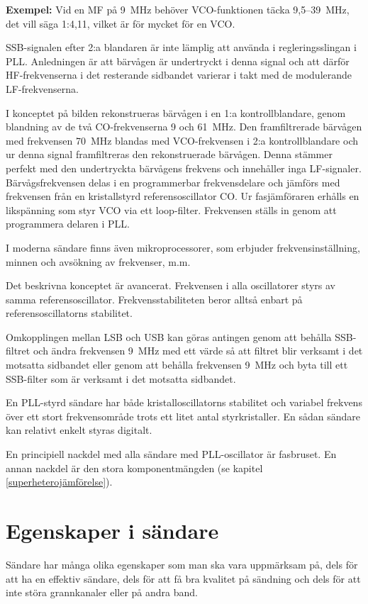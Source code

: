 \textbf{Exempel:} Vid en MF på 9~MHz behöver VCO-funktionen täcka 9,5--39~MHz,
det vill säga 1:4,11, vilket är för mycket för en VCO.

SSB-signalen efter 2:a blandaren är inte lämplig att använda i
regleringsslingan i PLL.
Anledningen är att bärvågen är undertryckt i denna signal och att därför
HF-frekvenserna i det resterande sidbandet varierar i takt med de
modulerande LF-frekvenserna.

I konceptet på bilden rekonstrueras bärvågen i en 1:a kontrollblandare,
genom blandning av de två CO-frekvenserna 9 och 61~MHz.
Den framfiltrerade bärvågen med frekvensen 70~MHz blandas med
VCO-frekvensen i 2:a kontrollblandare och ur denna signal
framfiltreras den rekonstruerade bärvågen.
Denna stämmer perfekt med den undertryckta bärvågens frekvens och
innehåller inga LF-signaler.
Bärvågsfrekvensen delas i en programmerbar frekvensdelare och jämförs
med frekvensen från en kristallstyrd referensoscillator CO.
Ur fasjämföraren erhålls en likspänning som styr VCO via ett loop-filter.
Frekvensen ställs in genom att programmera delaren i PLL.

I moderna sändare finns även mikroprocessorer, som erbjuder
frekvensinställning, minnen och avsökning av frekvenser, m.m.

Det beskrivna konceptet är avancerat.
Frekvensen i alla oscillatorer styrs av samma referensoscillator.
Frekvensstabiliteten beror alltså enbart på referensoscillatorns stabilitet.

Omkopplingen mellan LSB och USB kan göras antingen genom att behålla
SSB-filtret och ändra frekvensen 9~MHz med ett värde så att filtret
blir verksamt i det motsatta sidbandet eller genom att behålla
frekvensen 9~MHz och byta till ett SSB-filter som är verksamt i det
motsatta sidbandet.

En PLL-styrd sändare har både kristalloscillatorns stabilitet och variabel
frekvens över ett stort frekvensområde trots ett litet antal styrkristaller.
En sådan sändare kan relativt enkelt styras digitalt.

En principiell nackdel med alla sändare med PLL-oscillator är fasbruset.
En annan nackdel är den stora komponentmängden
(se kapitel \ref{superheterojämförelse}).

\section{Egenskaper i sändare}

Sändare har många olika egenskaper som man ska vara uppmärksam på, dels för
att ha en effektiv sändare, dels för att få bra kvalitet på sändning och dels
för att inte störa grannkanaler eller på andra band.

